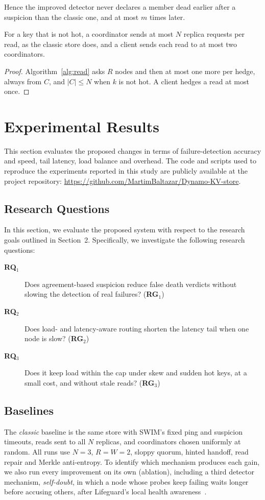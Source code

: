 \documentclass[sigconf,nonacm]{acmart}
\begin{document}
Hence the improved detector never declares a member dead earlier after a suspicion than the classic one, and at most $m$ times later.

\begin{theorem}
For a key that is not hot, a coordinator sends at most $N$ replica requests per read, as the classic store does, and a client sends each read to at most two coordinators.
\end{theorem}

\begin{proof}
Algorithm~\ref{alg:read} asks $R$ nodes and then at most one more per hedge, always from $C$, and $|C| \le N$ when $k$ is not hot. A client hedges a read at most once.
\end{proof}

\section{Experimental Results}

This section evaluates the proposed changes in terms of failure-detection accuracy and speed, tail latency, load balance and overhead. The code and scripts used to reproduce the experiments reported in this study are publicly available at the project repository: \url{https://github.com/MartimBaltazar/Dynamo-KV-store}.

\subsection{Research Questions}
In this section, we evaluate the proposed system with respect to the research goals outlined in Section~2. Specifically, we investigate the following research questions:
\begin{description}
  \item[\textbf{RQ}$_1$] Does agreement-based suspicion reduce false death verdicts without slowing the detection of real failures? (\textbf{RG}$_1$)
  \item[\textbf{RQ}$_2$] Does load- and latency-aware routing shorten the latency tail when one node is slow? (\textbf{RG}$_2$)
  \item[\textbf{RQ}$_3$] Does it keep load within the cap under skew and sudden hot keys, at a small cost, and without stale reads? (\textbf{RG}$_3$)
\end{description}

\subsection{Baselines}
The \emph{classic} baseline is the same store with SWIM's fixed ping and suspicion timeouts, reads sent to all $N$ replicas, and coordinators chosen uniformly at random. All runs use $N=3$, $R=W=2$, sloppy quorum, hinted handoff, read repair and Merkle anti-entropy. To identify which mechanism produces each gain, we also run every improvement on its own (ablation), including a third detector mechanism, \emph{self-doubt}, in which a node whose probes keep failing waits longer before accusing others, after Lifeguard's local health awareness~\cite{dadgar2018lifeguard}.
\end{document}
